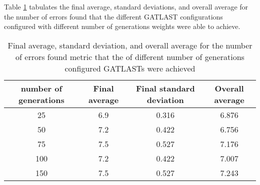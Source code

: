 Table \ref{tab:HP:GA:numGenerations:number of errors found} tabulates the final average, standard deviations, and overall average for the number of errors found that the different GATLAST configurations configured with different number of generations weights were able to achieve.
\begin{table}[tbh!]
\centering
\begin{adjustbox}{trim=0cm 0cm 0cm 0cm, clip=true}
\begin{tabular}{|c|c|c|c|}
\hline
number of generations & Final average & Final standard deviation & Overall average\\
\hline
25 & 6.9 & 0.316 & 6.876\\\hline
50 & 7.2 & 0.422 & 6.756\\\hline
75 & 7.5 & 0.527 & 7.176\\\hline
100 & 7.2 & 0.422 & 7.007\\\hline
150 & 7.5 & 0.527 & 7.243\\\hline
\end{tabular}
\end{adjustbox}
\caption{Final average, standard deviation, and overall average for the number of errors found metric that the of different number of generations configured GATLASTs were achieved}
\label{tab:HP:GA:numGenerations:number of errors found}
\end{table}